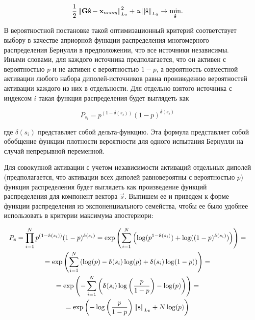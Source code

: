 \begin{equation}
    \frac{1}{2}\left\lVert\mathbf{G\hat{s} - x}_{noisy}\right\rVert^2_{L_2} + \upalpha\left\lVert\mathbf{\hat{s}}\right\rVert_{L_0}
    \rightarrow \underset{\mathbf{\hat{s}}}{\min}.
    \label{l0_optimization_crit}
\end{equation}

В вероятностной постановке такой оптимизационный критерий соответствует
выбору в качестве априорной функции распределения многомерного распределения
Бернулли в предположении, что все источники независимы. Иными словами,
для каждого источника предполагается, что он активен с вероятностью
$p$ и не активен с вероятностью $1-p$, а вероятность совместной активации
любого набора диполей-источников равна произведению вероятностей активации
каждого из них в отдельности.
Для отдельно взятого источника с индексом
$i$ такая функция распределения будет выглядеть как

\begin{equation}
    P_{s_i} = p^{(1 - \delta(s_i))} (1-p)^{\delta(s_i)}
\end{equation}

где $\delta(s_i)$ представляет собой дельта-функцию. Эта формула представляет
собой обобщение функции плотности вероятности для одного испытания Бернулли
на случай непрерывной переменной.

Для совокупной активации с учетом независимости активаций отдельных диполей
(предполагается, что активации всех диполей равновероятны с вероятностью $p$)
функция распределения будет выглядеть как произведение функций распределения
для компонент вектора $\vec{s}$. Выпишем ее и приведем к форме функции
распределения из экспоненциального семейства, чтобы ее было удобнее использовать
в критерии максимума апостериори:

\begin{multline}
    P_{\mathbf{s}} = \prod_{i=1}^{N} p^{(1-\updelta(s_i))} (1-p)^{\updelta(s_i)}=
    \exp\left(\sum_{i=1}^N \left(\log(p^{1-\updelta(s_i)}) + \log((1-p)^{\updelta(s_i)})\right)\right)=\\
    =\exp\left(\sum_{i=1}^N \left(\log(p) - \updelta(s_i) \log(p) + \updelta(s_i)\log(1-p)\right)\right)=\\
    =\exp\left(-\sum_{i=1}^N \left(\updelta(s_i) \log\left(\frac{p}{1-p}\right) - \log(p)\right)\right) = \\
    =\exp\left(-\log\left(\frac{p}{1-p}\right) \left\lVert\mathbf{s}\right\rVert_{L_0} + N\log(p)\right)
    \label{l0_multivariate_bernoulli_distribution}
\end{multline}

